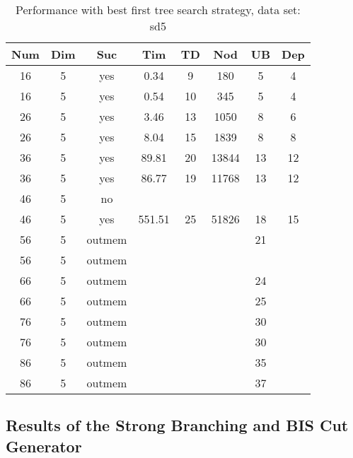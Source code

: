 \begin{table}[!htb]
  \centering
  \begin{tabular}[center]{|c|c|c|c|c|c|c|c|}
    \hline
    Num & Dim & Suc & Tim & TD & Nod & UB & Dep \\
    \hline
    16 & 5 & yes & 0.34 & 9 & 180 & 5 & 4 \\
    16 & 5 & yes & 0.54 & 10 & 345 & 5 & 4 \\
    26 & 5 & yes & 3.46 & 13 & 1050 & 8 & 6 \\
    26 & 5 & yes & 8.04 & 15 & 1839 & 8 & 8 \\
    36 & 5 & yes & 89.81 & 20 & 13844 & 13 & 12 \\
    36 & 5 & yes & 86.77 & 19 & 11768 & 13 & 12 \\
    46 & 5 & no &  &  &  &  &  \\
    46 & 5 & yes & 551.51 & 25 & 51826 & 18 & 15 \\
    56 & 5 & outmem &&&& 21 &\\
    56 & 5 & outmem &&&&  &\\
    66 & 5 & outmem &&&& 24 &\\
    66 & 5 & outmem &&&& 25 &\\
    76 & 5 & outmem &&&& 30 &\\
    76 & 5 & outmem &&&& 30 &\\
    86 & 5 & outmem &&&& 35 &\\
    86 & 5 & outmem &&&& 37 &\\
    \hline
  \end{tabular}
  \caption{Performance with best first tree search strategy, data set: sd5}
  \label{tab:test.sel-sd5}
\end{table}

\clearpage
\subsection{Results of the Strong Branching and BIS Cut Generator}
\label{sec:apd.bac.cutbis}

